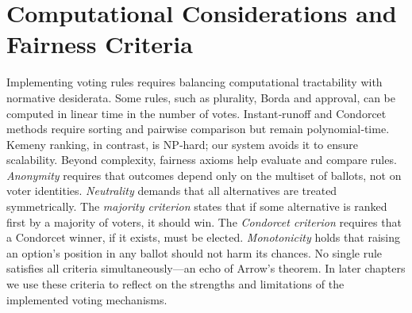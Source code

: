 \section{Computational Considerations and Fairness Criteria}

Implementing voting rules requires balancing computational
tractability with normative desiderata. \cite{[ADD CITATION for trade-offs in computational social choice]}  Some rules, such as plurality,
Borda and approval, can be computed in linear time in the number of
votes.  Instant‑runoff and Condorcet methods require sorting and pairwise
comparison but remain polynomial‑time.  Kemeny ranking, in contrast, is
NP‑hard; our system avoids it to ensure scalability.  Beyond complexity,
fairness axioms help evaluate and compare rules.  \emph{Anonymity}
requires that outcomes depend only on the multiset of ballots, not on
voter identities.  \emph{Neutrality} demands that all alternatives are
treated symmetrically.  The \emph{majority criterion} states that if
some alternative is ranked first by a majority of voters, it should win.
The \emph{Condorcet criterion} requires that a Condorcet winner, if it
exists, must be elected.  \emph{Monotonicity} holds that raising an
option’s position in any ballot should not harm its chances.  No single
rule satisfies all criteria simultaneously—an echo of Arrow’s theorem.
In later chapters we use these criteria to reflect on the strengths and
limitations of the implemented voting mechanisms.
